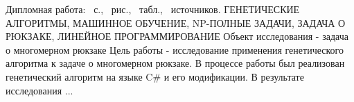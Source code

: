 Дипломная работа: \pageref*{LastPage}~с., \totfig~рис., \tottab~табл., \totref~источников.
ГЕНЕТИЧЕСКИЕ АЛГОРИТМЫ, МАШИННОЕ ОБУЧЕНИЕ, NP-ПОЛНЫЕ ЗАДАЧИ, ЗАДАЧА О РЮКЗАКЕ, ЛИНЕЙНОЕ ПРОГРАММИРОВАНИЕ
Объект исследования - задача о многомерном рюкзаке
Цель работы - исследование применения генетического алгоритма к задаче о многомерном рюкзаке.
В процессе работы был реализован генетический алгоритм на языке C\# и его модификации.
В результате исследования ...